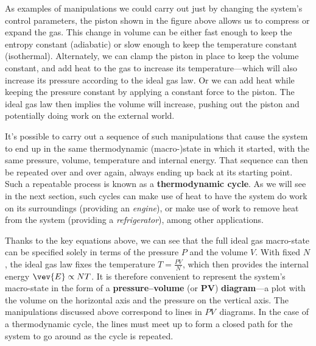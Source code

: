 As examples of manipulations we could carry out just by changing the system's control parameters, the piston shown in the figure above allows us to compress or expand the gas.
This change in volume can be either fast enough to keep the entropy constant (adiabatic) or slow enough to keep the temperature constant (isothermal).
Alternately, we can clamp the piston in place to keep the volume constant, and add heat to the gas to increase its temperature---which will also increase its pressure according to the ideal gas law.
Or we can add heat while keeping the pressure constant by applying a constant force to the piston.
The ideal gas law then implies the volume will increase, pushing out the piston and potentially doing work on the external world.

It's possible to carry out a sequence of such manipulations that cause the system to end up in the same thermodynamic (macro-)state in which it started, with the same pressure, volume, temperature and internal energy.
That sequence can then be repeated over and over again, always ending up back at its starting point.
Such a repeatable process is known as a \textbf{thermodynamic cycle}.
As we will see in the next section, such cycles can make use of heat to have the system do work on its surroundings (providing an \textit{engine}), or make use of work to remove heat from the system (providing a \textit{refrigerator}), among other applications.

Thanks to the key equations above, we can see that the full ideal gas macro-state can be specified solely in terms of the pressure $P$ and the volume $V$.
With fixed $N$, the ideal gas law fixes the temperature $T = \frac{PV}{N}$, which then provides the internal energy $\vev{E} \propto NT$.
It is therefore convenient to represent the system's macro-state in the form of a \textbf{pressure--volume} (or $\mathbf{PV}$) \textbf{diagram}---a plot with the volume on the horizontal axis and the pressure on the vertical axis.
The manipulations discussed above correspond to lines in $PV$~diagrams.
In the case of a thermodynamic cycle, the lines must meet up to form a closed path for the system to go around as the cycle is repeated.

